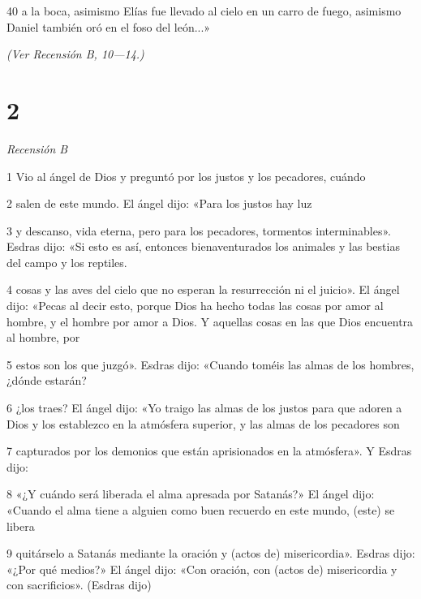 \par 40 a la boca, asimismo Elías fue llevado al cielo en un carro de fuego, asimismo
Daniel también oró en el foso del león...»

\par \textit{(Ver Recensión B, 10—14.)}

\chapter{2}

\par \textit{Recensión B}

\par 1 Vio al ángel de Dios y preguntó por los justos y los pecadores, cuándo

\par 2 salen de este mundo. El ángel dijo: «Para los justos hay luz

\par 3 y descanso, vida eterna, pero para los pecadores, tormentos interminables». Esdras dijo: «Si esto es así, entonces bienaventurados los animales y las bestias del campo y los reptiles.

\par 4 cosas y las aves del cielo que no esperan la resurrección ni el juicio». El ángel dijo: «Pecas al decir esto, porque Dios ha hecho todas las cosas por amor al hombre, y el hombre por amor a Dios. Y aquellas cosas en las que Dios encuentra al hombre, por

\par 5 estos son los que juzgó». Esdras dijo: «Cuando toméis las almas de los hombres, ¿dónde estarán?

\par 6 ¿los traes? El ángel dijo: «Yo traigo las almas de los justos para que adoren a Dios y los establezco en la atmósfera superior, y las almas de los pecadores son

\par 7 capturados por los demonios que están aprisionados en la atmósfera». Y Esdras dijo:

\par 8 «¿Y cuándo será liberada el alma apresada por Satanás?» El ángel dijo: «Cuando el alma tiene a alguien como buen recuerdo en este mundo, (este) se libera

\par 9 quitárselo a Satanás mediante la oración y (actos de) misericordia». Esdras dijo: «¿Por qué medios?» El ángel dijo: «Con oración, con (actos de) misericordia y con sacrificios». (Esdras dijo)

